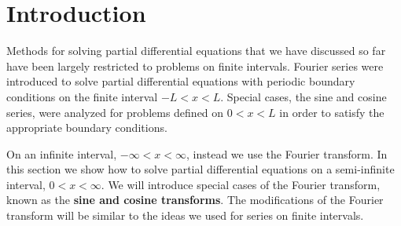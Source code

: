 \section{Introduction}
\label{sec:ft-intro}

Methods for solving partial differential equations that we have discussed so far have been largely restricted to problems on finite intervals.  Fourier series were introduced to solve partial differential equations with periodic boundary conditions on the finite interval $-L < x < L$.  Special cases, the sine and cosine series, were analyzed for problems defined on $0 < x < L$ in order to satisfy the appropriate boundary conditions.

On an infinite interval, $-\infty < x < \infty$, instead we use the Fourier transform.  In this section we show how to solve partial differential equations on a semi-infinite interval, $0 < x < \infty$.  We will introduce special cases of the Fourier transform, known as the \textbf{sine and cosine transforms}.  The modifications of the Fourier transform will be similar to the ideas we used for series on finite intervals.
